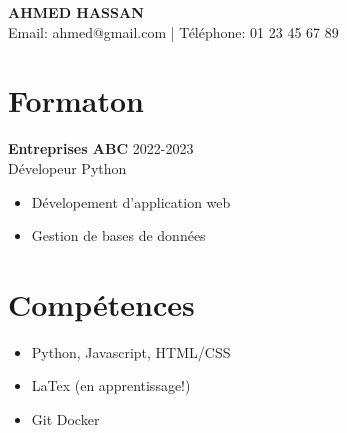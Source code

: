 \documentclass[11pt,a4paper]{article}
\begin{document}
	\begin{center}
		{\huge \textbf{AHMED HASSAN}}\\
		\vspace{0.5cm}
		Email: ahmed@gmail.com | Téléphone: 01 23 45 67 89
	\end{center}
	\section*{Formaton}
	\textbf{Entreprises ABC} \hfill 2022-2023 \\
	Dévelopeur Python
	\begin{itemize}
		\item Dévelopement d'application web
		\item Gestion de bases de données
	\end{itemize}
	
	\section*{Compétences}
	\begin{itemize}
		\item Python, Javascript, HTML/CSS
		\item LaTex (en apprentissage!)
		\item Git Docker
	\end{itemize}
\end{document}
